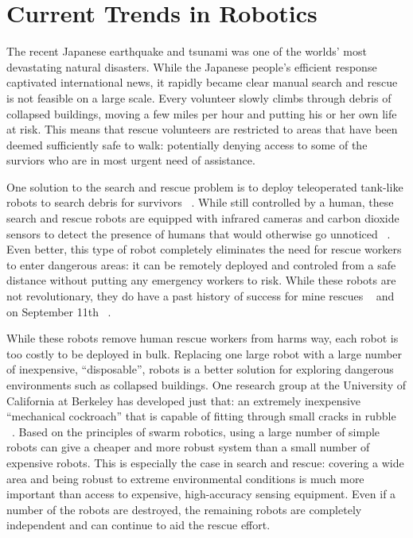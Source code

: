 \documentclass[twocolumn,11pt]{article}
\begin{document}
\section{Current Trends in Robotics}
\label{sec:econ}
The recent Japanese earthquake and tsunami was one of the worlds' most
devastating natural disasters. While the Japanese people's efficient response
captivated international news, it rapidly became clear manual search and rescue
is not feasible on a large scale. Every volunteer slowly climbs through debris
of collapsed buildings, moving a few miles per hour and putting his or her own
life at risk. This means that rescue volunteers are restricted to areas that
have been deemed sufficiently safe to walk: potentially denying access to some
of the surviors who are in most urgent need of assistance.

One solution to the search and rescue problem is to deploy teleoperated
tank-like robots to search debris for survivors ~\cite{search}. While still
controlled by a human, these search and rescue robots are equipped with
infrared cameras and carbon dioxide sensors to detect the presence of humans
that would otherwise go unnoticed ~\cite{search}. Even better,
this type of robot completely eliminates the need for rescue workers to enter
dangerous areas: it can be remotely deployed and controled from a safe
distance without putting any emergency workers to risk. While these robots are
not revolutionary, they do have a past history of success for mine rescues
~\cite{mine} and on September 11th ~\cite{sept11}.

While these robots remove human rescue workers from harms way, each robot is
too costly to be deployed in bulk. Replacing one large robot with a large
number of inexpensive, ``disposable'', robots is a better solution for
exploring dangerous environments such as collapsed buildings. One research
group at the University of California at Berkeley has developed just that: an
extremely inexpensive ``mechanical cockroach'' that is capable of fitting
through small cracks in rubble ~\cite{cockroach}. Based on the principles of
swarm robotics, using a large number of simple robots can give a cheaper and
more robust system than a small number of expensive robots. This is especially
the case in search and rescue: covering a wide area and being robust to extreme
environmental conditions is much more important than access to expensive,
high-accuracy sensing equipment. Even if a number of the robots are destroyed,
the remaining robots are completely independent and can continue to aid the
rescue effort.
\end{document}
